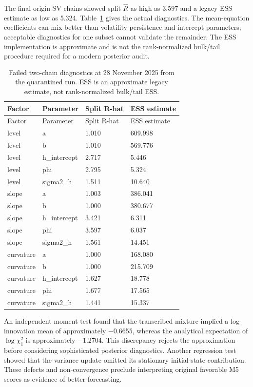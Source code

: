 \documentclass[
  12pt,
  letterpaper,
  DIV=11,
  numbers=noendperiod]{scrreprt}
\begin{document}
The final-origin SV chains showed split \(\widehat R\) as high as 3.597
and a legacy ESS estimate as low as 5.324. Table~\ref{tbl-failed-diag}
gives the actual diagnostics. The mean-equation coefficients can mix
better than volatility persistence and intercept parameters; acceptable
diagnostics for one subset cannot validate the remainder. The ESS
implementation is approximate and is not the rank-normalized bulk/tail
procedure required for a modern posterior audit.

\begin{longtable}[]{@{}llll@{}}
\caption{Failed two-chain diagnostics at 28 November 2025 from the
quarantined run. ESS is an approximate legacy estimate, not
rank-normalized bulk/tail ESS.}\label{tbl-failed-diag}\tabularnewline
\toprule\noalign{}
Factor & Parameter & Split R-hat & ESS estimate \\
\midrule\noalign{}
\endfirsthead
\toprule\noalign{}
Factor & Parameter & Split R-hat & ESS estimate \\
\midrule\noalign{}
\endhead
\bottomrule\noalign{}
\endlastfoot
level & a & 1.010 & 609.998 \\
level & b & 1.010 & 569.776 \\
level & h\_intercept & 2.717 & 5.446 \\
level & phi & 2.795 & 5.324 \\
level & sigma2\_h & 1.511 & 10.640 \\
slope & a & 1.003 & 386.041 \\
slope & b & 1.000 & 380.677 \\
slope & h\_intercept & 3.421 & 6.311 \\
slope & phi & 3.597 & 6.037 \\
slope & sigma2\_h & 1.561 & 14.451 \\
curvature & a & 1.000 & 168.080 \\
curvature & b & 1.000 & 215.709 \\
curvature & h\_intercept & 1.627 & 18.778 \\
curvature & phi & 1.677 & 17.565 \\
curvature & sigma2\_h & 1.441 & 15.337 \\
\end{longtable}

An independent moment test found that the transcribed mixture implied a
log-innovation mean of approximately −0.6655, whereas the analytical
expectation of \(\log\chi^2_1\) is approximately −1.2704. This
discrepancy rejects the approximation before considering sophisticated
posterior diagnostics. Another regression test showed that the variance
update omitted its stationary initial-state contribution. These defects
and non-convergence preclude interpreting original favorable M5 scores
as evidence of better forecasting.
\end{document}
